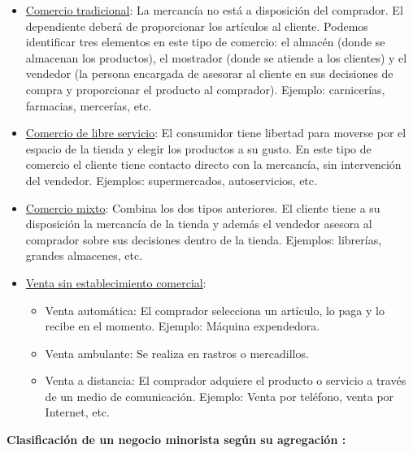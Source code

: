 \begin{itemize}
	
	\item \underline{Comercio tradicional}:  La mercancía no está a disposición del comprador. El dependiente deberá de proporcionar los artículos al cliente. Podemos identificar tres elementos en este tipo de comercio: el almacén (donde se almacenan los productos), el mostrador (donde se atiende a los clientes) y el vendedor (la persona encargada de asesorar al cliente en sus decisiones de compra y proporcionar el producto al comprador). Ejemplo: carnicerías, farmacias, mercerías, etc. 
	\item \underline{Comercio de libre servicio}: El consumidor tiene libertad para moverse por el espacio de la tienda y elegir los productos a su gusto. En este tipo de comercio el cliente tiene contacto directo con la mercancía, sin intervención del vendedor.  Ejemplos: supermercados, autoservicios, etc. 
	\item \underline{Comercio mixto}: Combina los dos tipos anteriores. El cliente tiene a su disposición la mercancía de la tienda y además el vendedor asesora al comprador sobre sus decisiones dentro de la tienda. Ejemplos: librerías, grandes almacenes, etc. 
	\item \underline{Venta sin establecimiento comercial}: 
	\begin{itemize}
		\item Venta automática: El comprador selecciona un artículo, lo paga y lo recibe en el momento. Ejemplo: Máquina expendedora. 
		\item Venta ambulante: Se realiza en rastros o mercadillos.
		\item Venta a distancia: El comprador adquiere el producto o servicio a través de un medio de comunicación. Ejemplo: Venta por teléfono, venta por Internet, etc. 
	\end{itemize}
\end{itemize}

\textbf{Clasificación de un negocio minorista según su agregación \cite{wikiMinorista}:}

